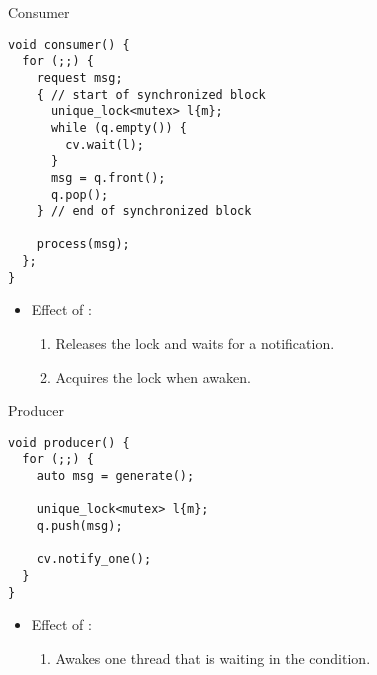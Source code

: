 \begin{frame}[t,fragile]{Consumer}
\begin{lstlisting}
void consumer() {
  for (;;) {
    request msg;
    { // start of synchronized block
      unique_lock<mutex> l{m};
      while (q.empty()) {
        cv.wait(l);
      }
      msg = q.front();
      q.pop();
    } // end of synchronized block
   
    process(msg);
  };
}
\end{lstlisting}
\begin{itemize}
  \item Effect of :
    \begin{enumerate}
      \item Releases the lock and waits for a notification.
      \item Acquires the lock when awaken.
    \end{enumerate}
\end{itemize}
\end{frame}

\begin{frame}[t,fragile]{Producer}
\begin{lstlisting}
void producer() {
  for (;;) {
    auto msg = generate();

    unique_lock<mutex> l{m};
    q.push(msg);

    cv.notify_one();
  }
}
\end{lstlisting}
\begin{itemize}
\item Effect of :
  \begin{enumerate}
    \item Awakes one thread that is waiting in the condition.
  \end{enumerate}
\end{itemize}
\end{frame}
